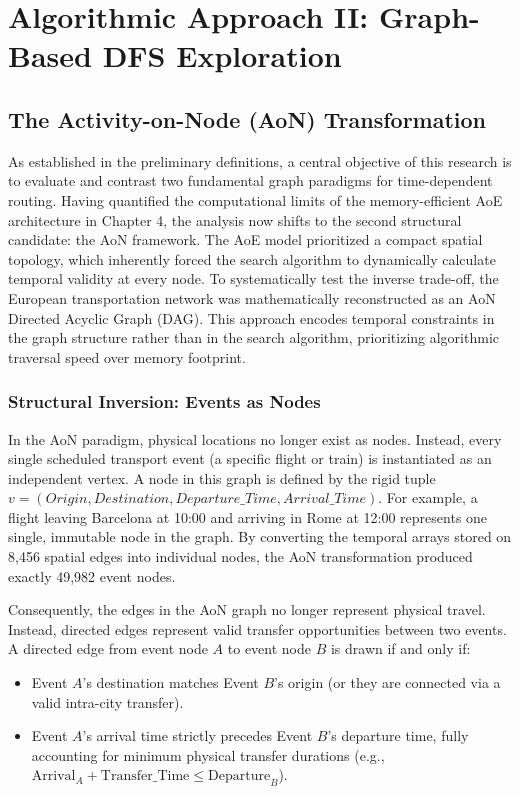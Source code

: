 \chapter{Algorithmic Approach II: Graph-Based DFS Exploration}
\label{chap:graph_approach}

\section{The Activity-on-Node (AoN) Transformation}
\label{sec:aon_transformation}

As established in the preliminary definitions, a central objective of this research is to evaluate and contrast two fundamental graph paradigms for time-dependent routing. Having quantified the computational limits of the memory-efficient AoE architecture in Chapter 4, the analysis now shifts to the second structural candidate: the AoN framework. The AoE model prioritized a compact spatial topology, which inherently forced the search algorithm to dynamically calculate temporal validity at every node. To systematically test the inverse trade-off, the European transportation network was mathematically reconstructed as an AoN Directed Acyclic Graph (DAG). This approach encodes temporal constraints in the graph structure rather than in the search algorithm, prioritizing algorithmic traversal speed over memory footprint.

\subsection{Structural Inversion: Events as Nodes}
\label{subsec:aon_events_as_nodes}

In the AoN paradigm, physical locations no longer exist as nodes. Instead, every single scheduled transport event (a specific flight or train) is instantiated as an independent vertex. A node in this graph is defined by the rigid tuple $v = ({Origin}, {Destination}, {Departure\_Time}, {Arrival\_Time})$. For example, a flight leaving Barcelona at 10:00 and arriving in Rome at 12:00 represents one single, immutable node in the graph. By converting the temporal arrays stored on 8,456 spatial edges into individual nodes, the AoN transformation produced exactly 49,982 event nodes.

\medskip

Consequently, the edges in the AoN graph no longer represent physical travel. Instead, directed edges represent valid transfer opportunities between two events. A directed edge from event node $A$ to event node $B$ is drawn if and only if:
\begin{itemize}
    \item Event $A$'s destination matches Event $B$'s origin (or they are connected via a valid intra-city transfer).
    \item Event $A$'s arrival time strictly precedes Event $B$'s departure time, fully accounting for minimum physical transfer durations (e.g., $\mathrm{Arrival}_A + \mathrm{Transfer\_Time} \leq \mathrm{Departure}_B$).
\end{itemize}

